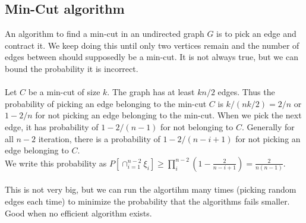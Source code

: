 \documentclass[a4paper]{article}
\begin{document}
\subsection*{Min-Cut algorithm}
An algorithm to find a min-cut in an undirected graph $G$ is to pick an edge and contract it. We keep doing this until only two vertices remain and the number of edges between should supposedly be a min-cut. It is not always true, but we can bound the probability it is incorrect. \\
\\
Let $C$ be a min-cut of size $k$. The graph has at least $kn/2$ edges. Thus the probability of picking an edge belonging to the min-cut $C$ is $k/(nk/2)=2/n$ or $1-2/n$ for not picking an edge belonging to the min-cut. When we pick the next edge, it has probability of $1-2/(n-1)$ for not belonging to $C$. Generally for all $n-2$ iteration, there is a probability of $1-2/(n-i+1)$ for not picking an edge belonging to $C$.\\
We write this probability as $P[\cap_{i=1}^{n-2} \xi_i]\geq \prod_i^{n-2} (1-\frac{2}{n-i+1})=\frac{2}{n(n-1)}$.\\
\\
This is not very big, but we can run the algortihm many times (picking random edges each time) to minimize the probability that the algorithms fails smaller. Good when no efficient algorithm exists.
\end{document}
